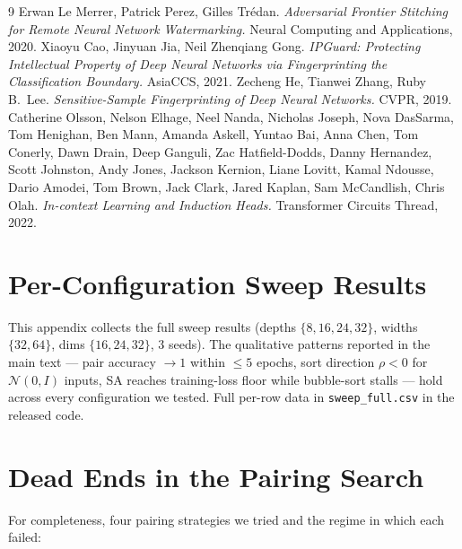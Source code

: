 \documentclass[10pt]{article}
\theoremstyle{remark}
\begin{document}
\begin{thebibliography}{9}
 Erwan Le Merrer, Patrick Perez, Gilles Tr\'edan.
  \emph{Adversarial Frontier Stitching for Remote Neural Network Watermarking.} Neural Computing and Applications, 2020.
 Xiaoyu Cao, Jinyuan Jia, Neil Zhenqiang Gong.
  \emph{IPGuard: Protecting Intellectual Property of Deep Neural Networks via Fingerprinting the Classification Boundary.} AsiaCCS, 2021.
 Zecheng He, Tianwei Zhang, Ruby B.~Lee.
  \emph{Sensitive-Sample Fingerprinting of Deep Neural Networks.} CVPR, 2019.
 Catherine Olsson, Nelson Elhage, Neel Nanda, Nicholas Joseph, Nova DasSarma, Tom Henighan, Ben Mann, Amanda Askell, Yuntao Bai, Anna Chen, Tom Conerly, Dawn Drain, Deep Ganguli, Zac Hatfield-Dodds, Danny Hernandez, Scott Johnston, Andy Jones, Jackson Kernion, Liane Lovitt, Kamal Ndousse, Dario Amodei, Tom Brown, Jack Clark, Jared Kaplan, Sam McCandlish, Chris Olah.
  \emph{In-context Learning and Induction Heads.} Transformer Circuits Thread, 2022.
\end{thebibliography}

\appendix

\section{Per-Configuration Sweep Results}
\label{app:sweep}

This appendix collects the full sweep results (depths
$\{8,16,24,32\}$, widths $\{32,64\}$, dims $\{16,24,32\}$, 3 seeds).
The qualitative patterns reported in the main text --- pair accuracy
$\to 1$ within $\leq 5$ epochs, sort direction $\rho<0$ for
$\mathcal{N}(0,I)$ inputs, SA reaches training-loss floor while
bubble-sort stalls --- hold across every configuration we tested.
Full per-row data in \texttt{sweep\_full.csv} in the released code.

\section{Dead Ends in the Pairing Search}
\label{app:deadends}

For completeness, four pairing strategies we tried and the regime in
which each failed:
\end{document}
